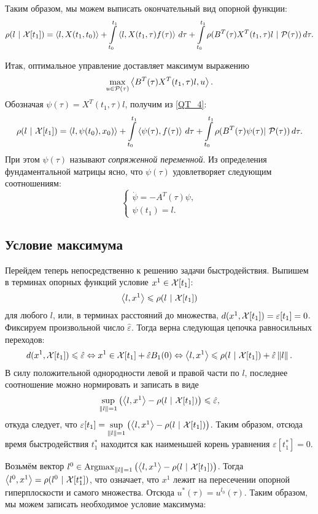 Таким образом, мы можем выписать окончательный вид опорной функции:
$$
  \rho(l\ |\ \soa[t_1]) =
    \scalar{l}{X(t_1,t_0)} +
    \int\limits_{t_0}^{t_1}
      \scalar{l}{X(t_1, \tau)f(\tau)}\,d\tau +
    \int\limits_{t_0}^{t_1}
      \rho(B^T(\tau)X^T(t_1, \tau)l\ |\ \mathcal{P}(\tau))\,d\tau.
$$
%
%

Итак, оптимальное управление доставляет максимум выражению 
$$
  \max\limits_{u \in \mathcal{P}(\tau)}
    \left<B^T(\tau)X^T(t_1, \tau)l,u\right>.
$$
Обозначая $\psi(\tau) = X^T(t_1, \tau)l$, получим из \eqref{QT_4}:
$$
  \rho(l\ |\ \soa[t_1]) = \scalar{l}{\psi(t_0),x_0)} +
    \int\limits_{t_0}^{t_1}\scalar{\psi(\tau)}{f(\tau)}\,d\tau +
    \int\limits_{t_0}^{t_1}\rho(B^T(\tau)\psi(\tau)|\ \mathcal{P}(\tau))\,d\tau.
$$
При этом $\psi(\tau)$ называют \textit{сопряженной переменной}.
Из определения фундаментальной матрицы ясно,
что $\psi(\tau)$ удовлетворяет следующим соотношениям:
$$
  \begin{cases}
    \dot{\psi} = - A^T(\tau)\psi,\\
    \psi(t_1) = l.
  \end{cases}
$$
\subsection{Условие максимума}
Перейдем теперь непосредственно к решению задачи быстродействия.  Выпишем в терминах опорных функций условие $x^1\in\mathcal{X}[t_1]$:
$$
  \scalar{l}{x^1}\leqslant\rho(l\ |\ \soa[t_1])
$$
для любого $l$, или, в терминах расстояний до множества,
$d(x^1, \mathcal{X}[t_1]) = \varepsilon[t_1] = 0$.
Фиксируем произвольной число $\hat{\varepsilon}$.
Тогда верна следующая цепочка равносильных переходов:
$$
  d(x^1,\mathcal{X}[t_1]) \leqslant 
  \hat{\varepsilon} \Leftrightarrow
  x^1 \in \mathcal{X}[t_1] + \hat{\varepsilon}B_1(0) \Leftrightarrow
  \left<l,x^1\right> \leqslant
  \rho(l\ |\ \mathcal{X}[t_1]) + \hat{\varepsilon}\left\| l \right\|.
$$
В силу положительной однородности левой и правой части по $l$,
последнее соотношение можно нормировать и записать в виде
$$
  \sup\limits_{\left\| l \right\| = 1}
  \left(
    \left<l,x^1\right> - \rho(l\ |\ \mathcal{X}[t_1])
  \right) \leqslant \hat\varepsilon,
$$
откуда следует, что
$
  \varepsilon[t_1] = 
  \sup\limits_{\left\| l \right\| = 1}
  \left(
    \left<l,x^1\right> - \rho(l\ |\ \mathcal{X}[t_1])
  \right)
$.
Таким образом, отсюда время быстродействия $t_1^*$
находится как наименьшей корень уравнения $\varepsilon[t_1^*] = 0$. 

Возьмём вектор
$
  l^0 \in \operatorname{Argmax}\limits_{\left\| l \right\| = 1}
  \left(
    \left<l,x^1\right> - \rho(l\ |\ \mathcal{X}[t_1])
  \right)
$.
Тогда $\left<l^0,x^1\right> = \rho(l^0\ |\ \mathcal{X}[t_1^*])$,
что означает, что $x^1$ лежит на пересечении
опорной гиперплоскости и самого множества.
Отсюда $u^*(\tau) = u^{l_0}(\tau)$.
Таким образом, мы можем записать необходимое условие максимума:

